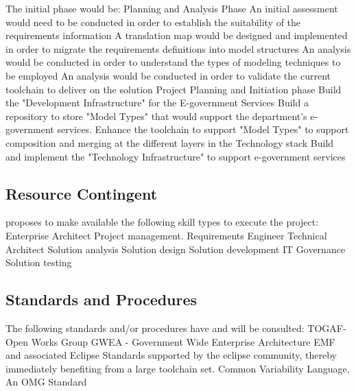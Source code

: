 The initial phase would be:
\slist
\spit Planning and Analysis Phase
\slist
\spit An initial assessment would need to be conducted in order to establish the suitability of the requirements information
\spit A translation map would be designed and implemented in order to migrate the requirements definitions into model structures
\spit An analysis would be conducted in order to understand the types of modeling techniques to be employed 
\spit An analysis would be conducted in order to validate the current toolchain to deliver on the solution
\spit Project Planning and Initiation phase
\elist
\spit Build the "Development Infrastructure" for the E-government Services
\slist
\spit Build a repository to store "Model Types" that would support the department's e-government services.
\spit Enhance the toolchain to support "Model Types" to support composition and merging at the different layers in the Technology stack
\elist
\spit Build and implement the "Technology Infrastructure" to support e-government services 
\elist
\subsection{Resource Contingent}
\vendor proposes to make available the following skill types to execute the project:
\slist
\spit Enterprise Architect
\spit Project management.
\spit Requirements Engineer
\spit Technical Architect
\spit Solution analysis 
\spit Solution design
\spit Solution development
\spit IT Governance
\spit Solution testing
\elist
\subsection{Standards and Procedures}
The following standards and/or procedures have and will be consulted:
\slist
\spit TOGAF- Open Works Group
\spit GWEA - Government Wide Enterprise Architecture
\spit \gls{EMF} and associated Eclipse Standards supported by the eclipse community, thereby immediately benefiting from a large toolchain set.
\spit Common Variability Language, An OMG Standard
\elist
